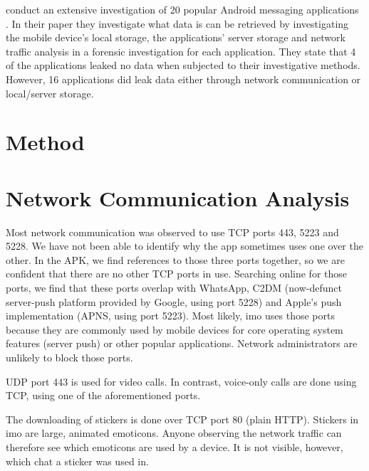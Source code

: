\documentclass[conference]{IEEEtran}
\begin{document}
\citeauthor{walnycky2015network} conduct an extensive investigation of 20
popular Android messaging applications \cite{walnycky2015network}. In their
paper they investigate what data is can be retrieved by investigating the mobile
device's local storage, the applications' server storage and network traffic
analysis in a forensic investigation for each application. They state that 4 of
the applications leaked no data when subjected to their investigative methods.
However, 16 applications did leak data either through network communication or
local/server storage.





\section{Method}\label{sec:method}


\section{Network Communication Analysis}\label{sec:comm}

Most network communication was observed to use TCP ports 443, 5223 and 5228. We
have not been able to identify why the app sometimes uses one over the other.
In the APK, we find references to those three ports together, so we are
confident that there are no other TCP ports in use. Searching online for those
ports, we find that these ports overlap with WhatsApp, C2DM (now-defunct
server-push platform provided by Google, using port 5228) and Apple's push
implementation (APNS, using port 5223). Most likely, imo uses those ports
because they are commonly used by mobile devices for core operating system
features (server push) or other popular applications. Network administrators
are unlikely to block those ports.

UDP port 443 is used for video calls. In contrast, voice-only calls are done
using TCP, using one of the aforementioned ports.

The downloading of stickers is done over TCP port 80 (plain HTTP). Stickers in
imo are large, animated emoticons. Anyone observing the network traffic can
therefore see which emoticons are used by a device. It is not visible, however,
which chat a sticker was used in. %
\end{document}
